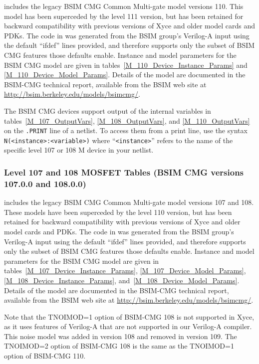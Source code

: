 \Xyce{} includes the legacy BSIM CMG Common Multi-gate model versions 110. 
This model has been superceded by the level 111 version, but has been retained for 
backward compatibility with previous versions of Xyce and older model cards and PDKs.
The code in \Xyce{} was generated from the BSIM group's Verilog-A
input using the default ``ifdef'' lines provided, and therefore
supports only the subset of BSIM CMG features those defaults enable.
Instance and model parameters for the BSIM CMG model are given in
tables~\ref{M_110_Device_Instance_Params} and
\ref{M_110_Device_Model_Params}.  Details of the model are documented
in the BSIM-CMG technical report\cite{BSIMCMG:Manual}, available from
the BSIM web site at
\url{http://bsim.berkeley.edu/models/bsimcmg/}.

The BSIM CMG devices support output of the internal variables in
tables~\ref{M_107_OutputVars}, \ref{M_108_OutputVars}, and  \ref{M_110_OutputVars} on the \texttt{.PRINT} line of a netlist.
To access them from a print line, use the syntax
\texttt{N(<instance>:<variable>)} where ``\texttt{<instance>}'' refers to the
name of the specific level 107 or 108 M device in your netlist.





\subsubsection{Level 107  and 108 MOSFET Tables (BSIM CMG versions 107.0.0 and 108.0.0)}
\Xyce{} includes the legacy BSIM CMG Common Multi-gate model versions 107 and 108.
These models have been superceded by the level 110 version, but has been
retained for backward compatibility with previous versions of Xyce and
older model cards and PDKs.  The code in \Xyce{} was generated from the BSIM
group's Verilog-A input using the default ``ifdef'' lines provided,
and therefore supports only the subset of BSIM CMG features those
defaults enable.  Instance and model parameters for the BSIM CMG model
are given in tables~\ref{M_107_Device_Instance_Params},
\ref{M_107_Device_Model_Params}, \ref{M_108_Device_Instance_Params},
and~\ref{M_108_Device_Model_Params}.  Details of the model are documented
in the BSIM-CMG technical report\cite{BSIMCMG:Manual}, available from
the BSIM web site at \url{http://bsim.berkeley.edu/models/bsimcmg/}.

Note that the TNOIMOD=1 option of BSIM-CMG 108 is not supported in
Xyce, as it uses features of Verilog-A that are not supported in our
Verilog-A compiler.  This noise model was added in version 108 and
removed in version 109.  The TNOIMOD=2 option of BSIM-CMG 108 is the
same as the TNOIMOD=1 option of BSIM-CMG 110.

